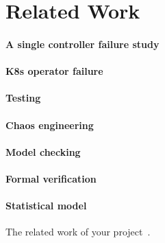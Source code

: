 \section{Related Work}
\label{sec:related_work}
\paragraph*{A single controller failure study}
\paragraph*{K8s operator failure}
\paragraph*{Testing}
\paragraph*{Chaos engineering}
\paragraph*{Model checking}
\paragraph*{Formal verification}
\paragraph*{Statistical model}


The related work of your project~\cite{Dijkstra:SOSP:1967}.
